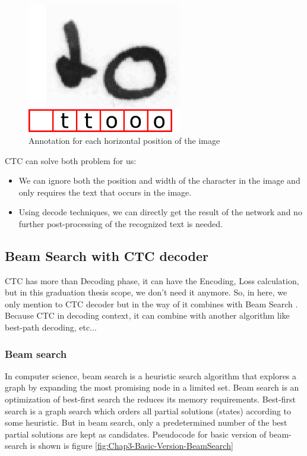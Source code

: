 \begin{figure}[H]
	\centering
	\includegraphics[width=0.6\textwidth]{img/Chap3/Annotation-image-CTC}
	\caption{ Annotation for each horizontal position of the image }
	\label{fig:Chap3-Annottion-image-CTC}
\end{figure}
CTC can solve both problem for us:
\begin{itemize}
	\item We can ignore both the position and width of the character in the image
	      and only requires the text that occurs in the image.
	\item Using decode techniques, we can directly get the result of the network and
	      no further post-processing of the recognized text is needed.
\end{itemize}

\subsection{Beam Search with CTC decoder}
CTC has more than Decoding phase, it can have the Encoding, Loss calculation, but in
this graduation thesis scope, we don't need it anymore. So, in here, we only
mention to CTC decoder but in the way of it combines with Beam Search \cite{scheidl2018word}. Because CTC
in decoding context, it can combine with another algorithm like best-path decoding, etc...

\subsubsection{Beam search}
In computer science, beam search \cite{BeamSearch} is a heuristic search algorithm that
explores a graph by expanding the most promising node in a limited set.
Beam search is an optimization of best-first search the reduces its memory
requirements. Best-first search is a graph search which orders all
partial solutions (states) according to some heuristic. But in beam search,
only a predetermined number of the best partial solutions are kept as candidates.
Pseudocode for basic version of beam-search is shown is figure \ref{fig:Chap3-Basic-Version-BeamSearch}

